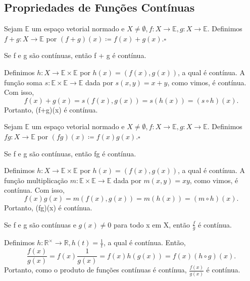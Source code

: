 \documentclass[metric_notes.tex]{subfiles}
\begin{document}
\subsection{Propriedades de Funções Contínuas}
\begin{def*}
	Sejam \(\mathbb{E}\) um espaço vetorial normado e \(X \neq\emptyset, f:X\rightarrow \mathbb{E}, g:X\rightarrow \mathbb{E}.\)
	Definimos \(f+g:X\rightarrow \mathbb{E}\) por \((f+g)(x)\coloneqq f(x)+g(x).\square\)
\end{def*}
\begin{prop*}
	Se f e g são contínuas, então f + g é contínua.
\end{prop*}
\begin{proof*}
	Definimos \(h:X\rightarrow \mathbb{E}\times \mathbb{E}\) por \(h(x) = (f(x), g(x))\), a qual é contínua. A função soma
	\(s:\mathbb{E}\times \mathbb{E}\rightarrow \mathbb{E}\) dada por \(s(x, y) = x + y\), como vimos, é contínua. Com isso,
	\[
		f(x)+g(x)=s(f(x), g(x)) = s(h(x)) = (s\circ{h})(x).
	\]
	Portanto, (f+g)(x) é contínua.\qedsymbol
\end{proof*}
\begin{def*}
	Sejam \(\mathbb{E}\) um espaço vetorial normado e \(X \neq\emptyset, f:X\rightarrow \mathbb{E}, g:X\rightarrow \mathbb{E}.\)
	Definimos \(fg:X\rightarrow \mathbb{E}\) por \((fg)(x)\coloneqq f(x)g(x).\square\)
\end{def*}
\begin{prop*}
	Se f e g são contínuas, então fg é contínua.
\end{prop*}
\begin{proof*}
	Definimos \(h:X\rightarrow \mathbb{E}\times \mathbb{E}\) por \(h(x) = (f(x), g(x))\), a qual é contínua. A função multiplicação
	\(m:\mathbb{E}\times \mathbb{E}\rightarrow \mathbb{E}\) dada por \(m(x, y) = xy\), como vimos, é contínua. Com isso,
	\[
		f(x)g(x)=m(f(x), g(x)) = m(h(x)) = (m\circ{h})(x).
	\]
	Portanto, (fg)(x) é contínua.\qedsymbol
\end{proof*}
\begin{prop*}
	Se f e g são contínuas e \(g(x)\neq0\) para todo x em X, então \(\frac{f}{g}\) é contínua.
\end{prop*}
\begin{proof*}
	Definimos \(h:\mathbb{R}^{\times}\rightarrow \mathbb{R}, h(t)=\frac{1}{t}\), a qual é contínua. Então,
	\[
		\frac{f(x)}{g(x)} = f(x)\frac{1}{g(x)} = f(x)h(g(x)) = f(x)(h\circ{g})(x).
	\]
	Portanto, como o produto de funções contínuas é contínua, \(\frac{f(x)}{g(x)}\) é contínua. \qedsymbol
\end{proof*}
\end{document}
